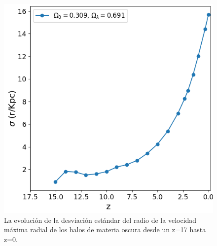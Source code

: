 \documentclass{beamer}
\begin{document}
\begin{frame}
\begin{columns}[t]
			\begin{column}{.5\textwidth}
				\begin{figure}
					\centering
					\includegraphics[scale=0.3]{RunCanonica/VMaxRad_Std_RunCanonica.png}
					\caption{\footnotesize La evolución de la desviación estándar del radio de la velocidad máxima radial de los halos de materia oscura desde un z=17 hasta z=0.}
					\label{fig:Canon-VMaxRadStd}
				\end{figure}
			\end{column}
		\end{columns}

	\end{frame}	

\end{document}
